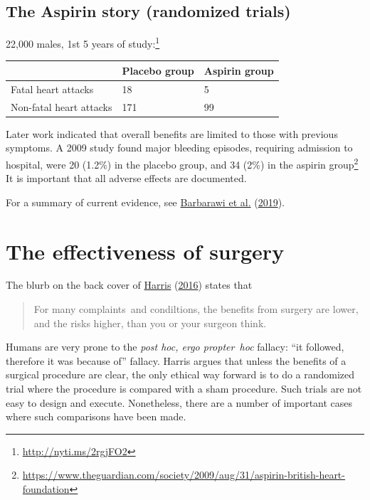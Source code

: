 \documentclass[
  10pt,
  b5paper]{book}
\begin{document}
\hypertarget{the-aspirin-story-randomized-trials}{%
\subsection*{The Aspirin story (randomized trials)}\label{the-aspirin-story-randomized-trials}}

22,000 males, 1st 5 years of study:\footnote{\url{http://nyti.ms/2rgjFO2}}

\begin{longtable}[]{@{}lll@{}}
\toprule
& Placebo group & Aspirin group \\
\midrule
\endhead
Fatal heart attacks & 18 & 5 \\
Non-fatal heart attacks & 171 & 99 \\
\bottomrule
\end{longtable}

Later work indicated that overall benefits are limited to those
with previous symptoms. A 2009 study found major bleeding episodes,
requiring admission to hospital, were 20 (1.2\%) in the placebo group,
and 34 (2\%) in the aspirin group\footnote{\url{https://www.theguardian.com/society/2009/aug/31/aspirin-british-heart-foundation}} It is important that all adverse effects are documented.

For a summary of current evidence, see \protect\hyperlink{ref-barbarawi2019aspirin}{Barbarawi et al.} (\protect\hyperlink{ref-barbarawi2019aspirin}{2019}).

\hypertarget{the-effectiveness-of-surgery}{%
\section{The effectiveness of surgery}\label{the-effectiveness-of-surgery}}

The blurb on the back cover of \protect\hyperlink{ref-harris2016book}{Harris} (\protect\hyperlink{ref-harris2016book}{2016}) states that

\begin{quote}
For many complaints~and condiltions, the benefits from surgery
are lower, and the risks higher, than you or your surgeon think.
\end{quote}

Humans are very prone to the \emph{post hoc, ergo propter~hoc} fallacy:
``it followed, therefore it was because of'' fallacy. Harris
argues that unless the benefits of a surgical procedure are clear,
the only ethical way forward is to do a randomized trial where
the procedure is compared with a sham procedure. Such trials
are not easy to design and execute. Nonetheless, there are a
number of important cases where such comparisons have been made.
\end{document}

